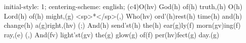 initial-style: 1;
centering-scheme: english;
(c4)O(hv) God(h) of(h) truth,(h) O(h) Lord(h) of(h) might,(g) <sp>*</sp>(,)
Who(hv) ord'(h)rest(h) time(h) and(h) change(h) a(g)right,(hv) (;)
And(h) send'st(h) the(h) ear(g)ly(f) morn(gv)ing(f) ray,(e) (,)
And(fv) light'st(gv) the(g) glow(g) of(f) per(hv)fect(g) day.(g)
